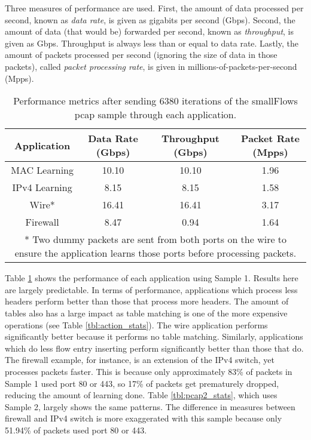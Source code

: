 Three measures of performance are used. First, the amount of data processed per second, known as \textit{data rate}, is given as gigabits per second (Gbps). Second, the amount of data (that would be) forwarded per second, known as \textit{throughput}, is given as Gbps. Throughput is always less than or equal to data rate. Lastly, the amount of packets processed per second (ignoring the size of data in those packets), called \textit{packet processing rate}, is given in millions-of-packets-per-second (Mpps).

\begin{table}
\caption{Performance metrics after sending 6380 iterations of the smallFlows pcap sample through each application.}
\begin{center}
\begin{tabularx}{0.9\textwidth}{| c || c | c | c |}
\hline
Application & Data Rate (Gbps) & Throughput (Gbps) & Packet Rate (Mpps)  \\
\hline
MAC Learning & 10.10 & 10.10 & 1.96  \\
\hline
IPv4 Learning & 8.15 & 8.15 & 1.58  \\
\hline 
Wire* & 16.41 & 16.41 & 3.17 \\
\hline
Firewall & 8.47 & 0.94 & 1.64 \\
\hline
\multicolumn{4}{p{0.9\textwidth}}{* Two dummy packets are sent from both ports on the wire to ensure the application learns those ports before processing packets.}
\end{tabularx}
\end{center}
\label{tbl:pcap1_stats}
\end{table}


Table \ref{tbl:pcap1_stats} shows the performance of each application using Sample 1. Results here are largely predictable. 
In terms of performance, applications which process less headers perform better than those that process more headers. The amount of tables also has a large impact as table matching is one of the more expensive operations (see Table \ref{tbl:action_stats}). The wire application performs significantly better because it performs no table matching.
Similarly, applications which do less flow entry inserting perform significantly better than those that do. The firewall example, for instance, is an extension of the IPv4 switch, yet processes packets faster. This is because only approximately 83\% of packets in Sample 1 used port 80 or 443, so 17\% of packets get prematurely dropped, reducing the amount of learning done.
Table \ref{tbl:pcap2_stats}, which uses Sample 2, largely shows the same patterns. 
The difference in measures between firewall and IPv4 switch is more exaggerated with this sample because only 51.94\% of packets used port 80 or 443.

